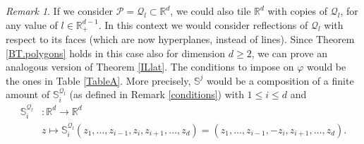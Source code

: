 \documentclass{amsart}
\theoremstyle{definition}
\theoremstyle{remark}
\newtheorem{remark}[theorem]{Remark}
\def\RR{\mathbb{R}}
\renewcommand\leq\leqslant
\renewcommand\geq\geqslant
\numberwithin{equation}{section}
\theoremstyle{definition}
\theoremstyle{remark}
\def\RR{\mathbb{R}}
\begin{document}
\begin{remark}\label{higdem}
	If we consider $\mathcal{P}=\mathcal{Q}_l\subset\RR^d$, we could also tile $\mathbb{R}^d$ with copies of $\mathcal{Q}_l$, for any value of $l\in\mathbb{R}^{d-1}_+$. In this context we would consider reflections of $\mathcal{Q}_l$ with respect to its faces (which are now hyperplanes, instead of lines). Since Theorem \ref{BT.polygons} holds in this case also for dimension $d\geq2$, we can prove an analogous version of Theorem \ref{ILlat}. The conditions to impose on $\varphi$ would be the ones in Table \ref{TableA}. More precisely, $\mathbb{S}^j$ would be a composition of a finite amount of $\mathbb{S}_i^{\mathcal{Q}_l}$ (as defined in Remark \ref{conditions}) with $1\leq i\leq d$ and \begin{equation}
		\begin{aligned}
		\mathbb{S}_i^{\mathcal{Q}_l}&:\mathbb{R}^d\rightarrow\mathbb{R}^d\\	&z\mapsto\mathbb{S}_i^{\mathcal{Q}_l}\left(z_1,\ldots,z_{i-1},z_i,z_{i+1},\ldots,z_d\right)=\left(z_1,\ldots,z_{i-1},-z_i,z_{i+1},\ldots,z_d\right).
		\end{aligned}
	\end{equation}
\end{remark}
\end{document}
